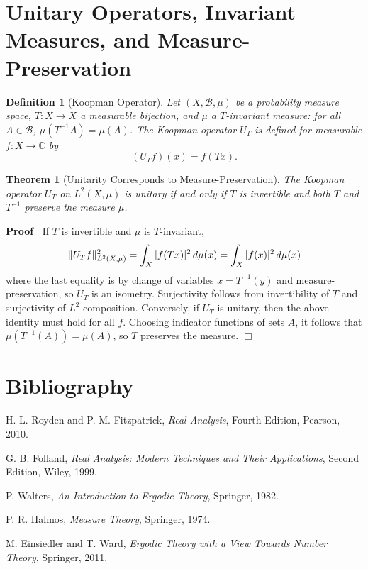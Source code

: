 \documentclass{article}
\newcommand{\tmem}[1]{{\em #1\/}}
\newenvironment{proof}{\noindent\textbf{Proof\ }}{\hspace*{\fill}$\Box$\medskip}
\newtheorem{definition}{Definition}
\newtheorem{theorem}{Theorem}
\begin{document}
\section{Unitary Operators, Invariant Measures, and Measure-Preservation}

\begin{definition}
  [Koopman Operator]\label{def:koopman} Let $(X, \mathcal{B}, \mu)$ be a
  probability measure space, $T : X \rightarrow X$ a measurable bijection, and
  $\mu$ a $T$-invariant measure: for all $A \in \mathcal{B}$, $\mu (T^{- 1} A)
  = \mu (A)$. The {\tmem{Koopman operator}} $U_T$ is defined for measurable $f
  : X \to \mathbb{C}$ by
  \begin{equation}
    \label{eq:koopman} (U_T f) (x) = f (Tx) .
  \end{equation}
\end{definition}

\begin{theorem}
  [Unitarity Corresponds to
  Measure-Preservation]\label{thm:measurepreserving_unitary} The Koopman
  operator $U_T$ on $L^2 (X, \mu)$ is unitary if and only if $T$ is invertible
  and both $T$ and $T^{- 1}$ preserve the measure $\mu$.
\end{theorem}

\begin{proof}
  If $T$ is invertible and $\mu$ is $T$-invariant,
  \[ \|U_T f\|_{L^2 (X, \mu)}^2 = \int_X |f (Tx) |^2  \hspace{0.17em} d \mu
     (x) = \int_X |f (x) |^2  \hspace{0.17em} d \mu (x) \]
  where the last equality is by change of variables $x = T^{- 1} (y)$ and
  measure-preservation, so $U_T$ is an isometry. Surjectivity follows from
  invertibility of $T$ and surjectivity of $L^2$ composition. Conversely, if
  $U_T$ is unitary, then the above identity must hold for all $f$. Choosing
  indicator functions of sets $A$, it follows that $\mu (T^{- 1} (A)) = \mu
  (A)$, so $T$ preserves the measure.
\end{proof}

\section{Bibliography}

\begin{thebibliography}{99}
  {}H. L. Royden and P. M. Fitzpatrick, {\tmem{Real
  Analysis}}, Fourth Edition, Pearson, 2010.
  
  {}G. B. Folland, {\tmem{Real Analysis: Modern Techniques
  and Their Applications}}, Second Edition, Wiley, 1999.
  
  {}P. Walters, {\tmem{An Introduction to Ergodic Theory}},
  Springer, 1982.
  
  {}P. R. Halmos, {\tmem{Measure Theory}}, Springer, 1974.
  
  {}M. Einsiedler and T. Ward, {\tmem{Ergodic Theory
  with a View Towards Number Theory}}, Springer, 2011.
\end{thebibliography}
\end{document}
